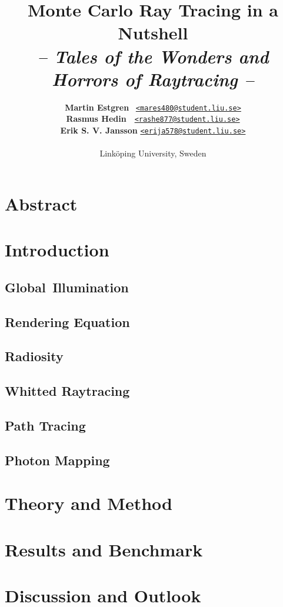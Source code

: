 \documentclass[a4paper, twocolumn]{article}
\title{\textbf{Monte Carlo Ray Tracing in a Nutshell}\\
       \Large{\textit{-- Tales of the Wonders and Horrors of Raytracing --}}}
\author{{\textbf{Martin Estgren}} \;\;\;\;\;\;\,   {\href{mailto:mares480@student.liu.se}
                                                       {\texttt{<mares480@student.liu.se>}}} \\
        {\textbf{Rasmus Hedin}} \;\;\;\;\;\;\;\,\, {\href{mailto:rashe877@student.liu.se}
                                                       {\texttt{<rashe877@student.liu.se>}}} \\
        {\textbf{Erik S. V. Jansson}} \;           {\href{mailto:erija578@student.liu.se}
                                                       {\texttt{<erija578@student.liu.se>}}} \\~\\
        {Linköping University, Sweden}\vspace{-2.0ex}}
\begin{document}
    \maketitle
    \section*{Abstract}

    \newpage \tableofcontents \clearpage

    \section{Introduction} \label{sec:introduction}

    \subsection{Global\, Illumination} \label{sec:global_illumination}

    \subsection{Rendering Equation} \label{sec:rendering_equation}

    \subsection{Radiosity} \label{sec:radiosity}

    \subsection{Whitted Raytracing} \label{sec:whitted_raytracing}

    \subsection{Path Tracing} \label{sec:path_tracing}

    \subsection{Photon Mapping} \label{sec:photon_mapping}

    \clearpage

    \section{Theory and Method} \label{sec:theory_and_method}

    \section{Results and Benchmark} \label{sec:results_and_benchmark}

    \section{Discussion and Outlook} \label{sec:discussion_and_outlook}

    \newpage %
    \nocite{*} %
    
    
\end{document}
